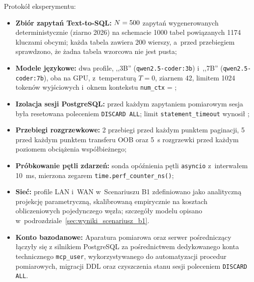 Protokół eksperymentu:
\begin{itemize}
    \item \textbf{Zbiór zapytań Text-to-SQL:} $N = 500$ zapytań wygenerowanych deterministycznie (ziarno 2026) na schemacie 1000 tabel powiązanych 1174 kluczami obcymi; każda tabela zawiera 200 wierszy, a~przed przebiegiem sprawdzono, że żadna tabela wzorcowa nie jest pusta;
    \item \textbf{Modele językowe:} dwa profile, ,,3B'' (\texttt{qwen2.5-coder:3b}) i~,,7B'' (\texttt{qwen2.5-coder:7b}), oba na GPU, z~temperaturą $T = 0$, ziarnem 42, limitem 1024 tokenów wyjściowych i~oknem kontekstu \texttt{num\_ctx} = \wynNumCtx;
    \item \textbf{Izolacja sesji PostgreSQL:} przed każdym zapytaniem pomiarowym sesja była resetowana poleceniem \texttt{DISCARD ALL}; limit \texttt{statement\_timeout} wynosił \wynStmtTimeout;
    \item \textbf{Przebiegi rozgrzewkowe:} 2 przebiegi przed każdym punktem paginacji, 5 przed każdym punktem transferu OOB oraz 5~s rozgrzewki przed każdym poziomem obciążenia współbieżnego;
    \item \textbf{Próbkowanie pętli zdarzeń:} sonda opóźnienia pętli \texttt{asyncio} z~interwałem 10~ms, mierzona zegarem \texttt{time.perf\_counter\_ns()};
    \item \textbf{Sieć:} profile LAN i~WAN w~Scenariuszu B1 zdefiniowano jako analityczną projekcję parametryczną, skalibrowaną empirycznie na kosztach obliczeniowych pojedynczego węzła; szczegóły modelu opisano w~podrozdziale~\ref{sec:wyniki_scenariusz_b1}.
    \item \textbf{Konto bazodanowe:} Aparatura pomiarowa oraz serwer pośredniczący łączyły się z silnikiem PostgreSQL za pośrednictwem dedykowanego konta technicznego \texttt{mcp\_user}, wykorzystywanego do automatyzacji procedur pomiarowych, migracji DDL oraz czyszczenia stanu sesji poleceniem \texttt{DISCARD ALL}.
\end{itemize}

